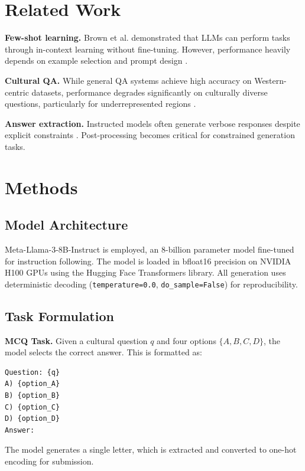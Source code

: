 \documentclass[11pt,a4paper,twocolumn]{article}
\begin{document}
\section{Related Work}

\textbf{Few-shot learning.} Brown et al. \cite{brown2020language} demonstrated that LLMs can perform tasks through in-context learning without fine-tuning. However, performance heavily depends on example selection \cite{liu2021makes} and prompt design \cite{reynolds2021prompt}.

\textbf{Cultural QA.} While general QA systems achieve high accuracy on Western-centric datasets, performance degrades significantly on culturally diverse questions, particularly for underrepresented regions \cite{gao2021making}.

\textbf{Answer extraction.} Instructed models often generate verbose responses despite explicit constraints \cite{wei2022chain,ouyang2022training}. Post-processing becomes critical for constrained generation tasks.

\section{Methods}

\subsection{Model Architecture}

Meta-Llama-3-8B-Instruct \cite{touvron2023llama} is employed, an 8-billion parameter model fine-tuned for instruction following. The model is loaded in bfloat16 precision on NVIDIA H100 GPUs using the Hugging Face Transformers library. All generation uses deterministic decoding (\texttt{temperature=0.0}, \texttt{do\_sample=False}) for reproducibility.

\subsection{Task Formulation}

\textbf{MCQ Task.} Given a cultural question $q$ and four options $\{A, B, C, D\}$, the model selects the correct answer. This is formatted as:
\begin{verbatim}
Question: {q}
A) {option_A}
B) {option_B}
C) {option_C}
D) {option_D}
Answer:
\end{verbatim}

The model generates a single letter, which is extracted and converted to one-hot encoding for submission.
\end{document}

